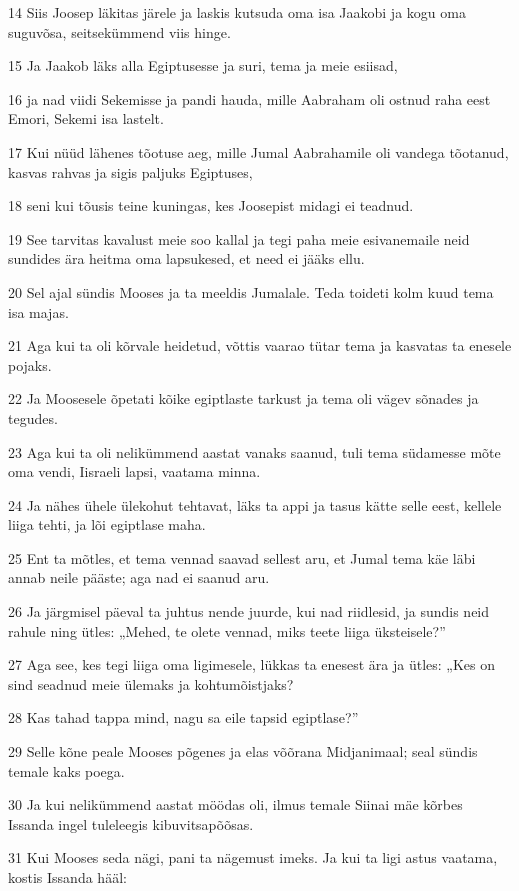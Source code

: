 \par 14 Siis Joosep läkitas järele ja laskis kutsuda oma isa Jaakobi ja kogu oma suguvõsa, seitsekümmend viis hinge.
\par 15 Ja Jaakob läks alla Egiptusesse ja suri, tema ja meie esiisad,
\par 16 ja nad viidi Sekemisse ja pandi hauda, mille Aabraham oli ostnud raha eest Emori, Sekemi isa lastelt.
\par 17 Kui nüüd lähenes tõotuse aeg, mille Jumal Aabrahamile oli vandega tõotanud, kasvas rahvas ja sigis paljuks Egiptuses,
\par 18 seni kui tõusis teine kuningas, kes Joosepist midagi ei teadnud.
\par 19 See tarvitas kavalust meie soo kallal ja tegi paha meie esivanemaile neid sundides ära heitma oma lapsukesed, et need ei jääks ellu.
\par 20 Sel ajal sündis Mooses ja ta meeldis Jumalale. Teda toideti kolm kuud tema isa majas.
\par 21 Aga kui ta oli kõrvale heidetud, võttis vaarao tütar tema ja kasvatas ta enesele pojaks.
\par 22 Ja Moosesele õpetati kõike egiptlaste tarkust ja tema oli vägev sõnades ja tegudes.
\par 23 Aga kui ta oli nelikümmend aastat vanaks saanud, tuli tema südamesse mõte oma vendi, Iisraeli lapsi, vaatama minna.
\par 24 Ja nähes ühele ülekohut tehtavat, läks ta appi ja tasus kätte selle eest, kellele liiga tehti, ja lõi egiptlase maha.
\par 25 Ent ta mõtles, et tema vennad saavad sellest aru, et Jumal tema käe läbi annab neile pääste; aga nad ei saanud aru.
\par 26 Ja järgmisel päeval ta juhtus nende juurde, kui nad riidlesid, ja sundis neid rahule ning ütles: „Mehed, te olete vennad, miks teete liiga üksteisele?”
\par 27 Aga see, kes tegi liiga oma ligimesele, lükkas ta enesest ära ja ütles: „Kes on sind seadnud meie ülemaks ja kohtumõistjaks?
\par 28 Kas tahad tappa mind, nagu sa eile tapsid egiptlase?”
\par 29 Selle kõne peale Mooses põgenes ja elas võõrana Midjanimaal; seal sündis temale kaks poega.
\par 30 Ja kui nelikümmend aastat möödas oli, ilmus temale Siinai mäe kõrbes Issanda ingel tuleleegis kibuvitsapõõsas.
\par 31 Kui Mooses seda nägi, pani ta nägemust imeks. Ja kui ta ligi astus vaatama, kostis Issanda hääl:
